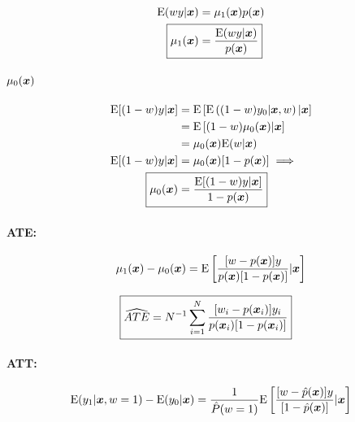 \documentclass[11pt, oneside, a4paper, article]{article}
\numberwithin{equation}{section}
\begin{document}
\begin{description}
\vspace{-1 em}
\begin{align*}
	\E( w y | \xvec ) &= \mu_{1}(\xvec) p(\xvec)
	\\
	\Aboxed{ \mu_{1}(\xvec) &= \frac{\E(w y | \xvec)}{p(\xvec)} }
\end{align*}

\paragraph{$\mu_{0}( \boldsymbol{x} )$}

\vspace{-1 em}
\begin{align*}
	\E[ (1-w) y | \xvec ] &= \E\left[  \E \left( (1 - w) y_{0} | \xvec, w  \right) | \xvec \right]
	\\ &=
	\E \left[ (1 - w) \mu_{0}(\xvec) | \xvec \right]
	\\ &=
	\mu_{0}(\xvec) \E(w | \xvec )
	\\ 
	\E[ (1-w) y | \xvec ] 
	&=
	\mu_{0}(\xvec) [1 - p(\xvec)] \implies
	\\ 
	\Aboxed{
		\mu_{0}(\xvec)
		&=
	\frac{\E[ (1-w) y | \xvec ] }{1 - p( \xvec ) } }
\end{align*}

\paragraph{ATE:}

\begin{align*}
	\mu_{1}(\boldsymbol{x}) - \mu_{0}(\boldsymbol{x}) =
	\text{E}\left[ 
		\frac{[w - p(\boldsymbol{x})] y}{p(\boldsymbol{x}) [1 - p(\boldsymbol{x})]}
		| \boldsymbol{x}
	\right]
\end{align*}

\begin{align*}
	\Aboxed{
		\widehat{ATE} =
		N^{-1} \sum_{i=1}^{N}
		\frac{[ w_{i} - p(\xvec_{i} ) ] y_{i} }{ p( \xvec_{i} ) [1 - p( \xvec_{i} ) ] }
	}
\end{align*}

\paragraph{ATT:}

\begin{align*}
	\text{E}( y_{1} | \boldsymbol{x}, w=1) - \text{E}(y_{0} | \boldsymbol{x}) =
	\frac{1}{\hat{P}(w=1)}
	\text{E}\left[ 
		\frac{[w - \hat{p}(\boldsymbol{x})] y}{[ 1 - \hat{p}(\boldsymbol{x}) ]}
		| \boldsymbol{x}
	\right]
\end{align*}


\end{description}
\end{document}
